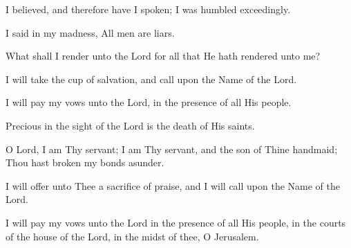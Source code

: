 I believed, and therefore have I spoken; I was humbled exceedingly.

I said in my madness, All men are liars.

What shall I render unto the Lord for all that He hath rendered unto me?

I will take the cup of salvation, and call upon the Name of the Lord.

I will pay my vows unto the Lord, in the presence of all His people.

Precious in the sight of the Lord is the death of His saints.

O Lord, I am Thy servant; I am Thy servant, and the son of Thine handmaid; Thou hast broken my bonds asunder.

I will offer unto Thee a sacrifice of praise, and I will call upon the Name of the Lord.

I will pay my vows unto the Lord in the presence of all His people, in the courts of the house of the Lord, in the midst of thee, O Jerusalem.
